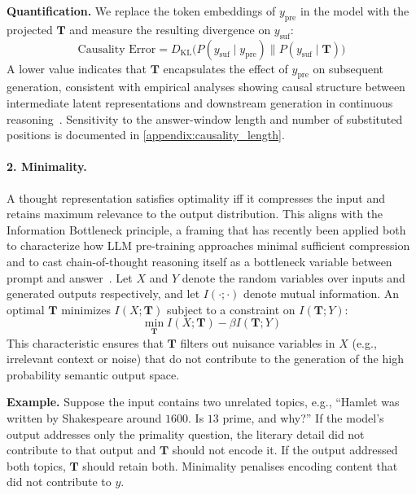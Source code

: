 \textbf{Quantification.} We replace the token embeddings of $y_{\mathrm{pre}}$ in the model with the projected $\mathbf{T}$ and measure the resulting divergence on $y_{\mathrm{suf}}$:
\begin{equation}\label{eq:causality-error}
    \text{Causality Error} = D_{\mathrm{KL}}\Big( P(y_{\mathrm{suf}} \mid y_{\mathrm{pre}}) \parallel P(y_{\mathrm{suf}} \mid \mathbf{T}) \Big)
\end{equation}
A lower value indicates that $\mathbf{T}$ encapsulates the effect of $y_{\mathrm{pre}}$ on subsequent generation, consistent with empirical analyses showing causal structure between intermediate latent representations and downstream generation in continuous reasoning~\citep{li2026dynamics}. Sensitivity to the answer-window length and number of substituted positions is documented in \cref{appendix:causality_length}.

\paragraph{2. Minimality.}
A thought representation satisfies optimality iff it compresses the input and retains maximum relevance to the output distribution. This aligns with the Information Bottleneck principle, a framing that has recently been applied both to characterize how LLM pre-training approaches minimal sufficient compression~\citep{conklin2026learning} and to cast chain-of-thought reasoning itself as a bottleneck variable between prompt and answer~\citep{massoli2026reasoning}. Let $X$ and $Y$ denote the random variables over inputs and generated outputs respectively, and let $I(\cdot;\cdot)$ denote mutual information. An optimal $\mathbf{T}$ minimizes $I(X; \mathbf{T})$ subject to a constraint on $I(\mathbf{T}; Y)$:
\begin{equation}\label{eq:minimality-axiom}
    \min_{\mathbf{T}} I(X; \mathbf{T}) - \beta I(\mathbf{T}; Y)
\end{equation}
This characteristic ensures that $\mathbf{T}$ filters out nuisance variables in $X$ (e.g., irrelevant context or noise) that do not contribute to the generation of the high probability semantic output space.

\textbf{Example.} Suppose the input contains two unrelated topics, e.g.,
``Hamlet was written by Shakespeare around $1600$. Is $13$ prime, and why?''
If the model's output addresses only the primality question, the literary
detail did not contribute to that output and $\mathbf{T}$ should not encode it.
If the output addressed both topics, $\mathbf{T}$ should retain both. Minimality penalises encoding content that did not contribute to $y$.

